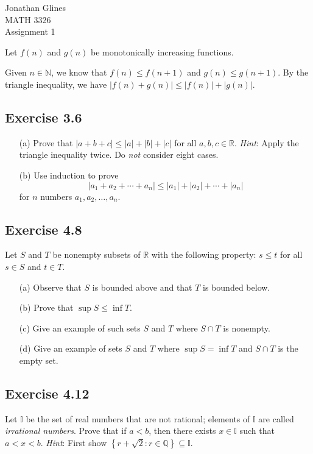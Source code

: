 \documentclass[12pt]{article}
\begin{document}
\begin{flushright}
{\Large
Jonathan Glines \\
MATH 3326 \\
Assignment 1 \\
}
\end{flushright}
Let $f(n)$ and $g(n)$ be monotonically increasing functions.

Given $n \in \mathbb{N}$, we know that $f(n) \leq f(n + 1)$ and $g(n) \leq g(n + 1)$. By the triangle inequality, we have $\left| f(n) + g(n) \right| \leq \left|f(n)\right| + \left|g(n)\right|$.

\subsection*{Exercise 3.6}
\begin{itemize}
\item[(a)] Prove that $\left|a + b + c\right| \leq \left|a\right| + \left|b\right| + \left|c\right|$ for all $a, b, c \in \mathbb{R}$. {\em Hint}: Apply the triangle inequality twice. Do {\em not} consider eight cases.
\item[(b)] Use induction to prove
\[
\left|a_1 + a_2 + \cdots + a_n\right| \leq \left|a_1\right| + \left|a_2\right| + \cdots + \left|a_n\right|
\]
for $n$ numbers $a_1, a_2, \dots, a_n$.
\end{itemize}

\subsection*{Exercise 4.8}
Let $S$ and $T$ be nonempty subsets of $\mathbb{R}$ with the following property: $s \leq t$ for all $s \in S$ and $t \in T$.
\begin{itemize}
\item[(a)] Observe that $S$ is bounded above and that $T$ is bounded below.
\item[(b)] Prove that $\sup S \leq \inf T$.
\item[(c)] Give an example of such sets $S$ and $T$ where $S \cap T$ is nonempty.
\item[(d)] Give an example of sets $S$ and $T$ where $\sup S = \inf T$ and $S \cap T$ is the empty set.
\end{itemize}

\subsection*{Exercise 4.12}
Let $\mathbb{I}$ be the set of real numbers that are not rational; elements of $\mathbb{I}$ are called {\em irrational numbers}. Prove that if $a < b$, then there exists $x \in \mathbb{I}$ such that $a < x < b$. {\em Hint}: First show $\left\{r + \sqrt{2} : r \in \mathbb{Q}\right\} \subseteq \mathbb{I}$.
\end{document}
